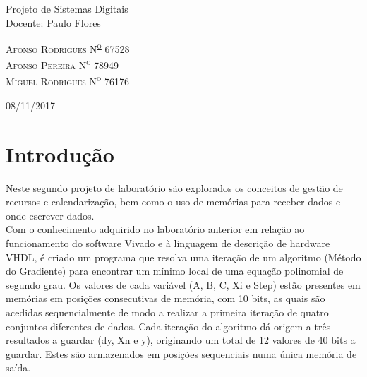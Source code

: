 \documentclass{article} %
\begin{document}
\begin{titlepage}
	Projeto de Sistemas Digitais \\ Docente: Paulo Flores

	\vspace*{3\baselineskip} %
	
	
	
	\vspace{0.5\baselineskip} %
	
	{\scshape\Large Afonso Rodrigues N\textsuperscript{\underline{o}} 67528 \\ Afonso Pereira N\textsuperscript{\underline{o}} 78949 \\ Miguel Rodrigues 
		N\textsuperscript{\underline{o}} 76176 \\} %
	
	\vspace{0.5\baselineskip} %
	
	\vfill %
	
	\vspace{0.3\baselineskip} %
	
	08/11/2017 %

\end{titlepage}



	
	\section{Introdução}
		Neste segundo projeto de laboratório são explorados os conceitos de gestão de recursos e calendarização, bem como o uso de memórias para receber dados e onde escrever dados.\\


		\noindent Com o conhecimento adquirido no laboratório anterior em relação ao funcionamento do software Vivado e à linguagem de descrição de hardware VHDL, é criado um programa que resolva uma iteração de um algoritmo (Método do Gradiente) para encontrar um mínimo local de uma equação polinomial de segundo grau. Os valores de cada variável (A, B, C, Xi e Step) estão presentes em memórias em posições consecutivas de memória, com 10 bits, as quais são acedidas sequencialmente de modo a realizar a primeira iteração de quatro conjuntos diferentes de dados. Cada iteração do algoritmo dá origem a três resultados a guardar (dy, Xn e y), originando um total de 12 valores de 40 bits a guardar. Estes são armazenados em posições sequenciais numa única memória de saída.\\	
\end{document}
